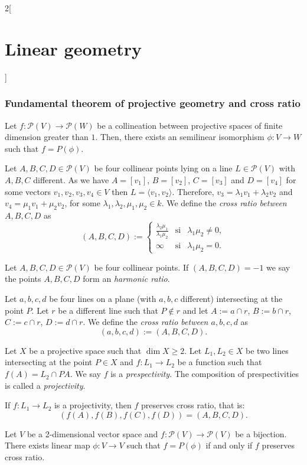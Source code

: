 \documentclass[class=article,10pt,crop=false]{standalone}
\begin{document}
\begin{multicols}{2}[\section{Linear geometry}]
\subsubsection*{Fundamental theorem of projective geometry and cross ratio}
\begin{theorem}
Let $f:\mathcal{P}(V)\rightarrow \mathcal{P}(W)$ be a collineation between projective spaces of finite dimension greater than $1$. Then, there exists an semilinear isomorphism $\phi:V\rightarrow W$ such that $f=P(\phi)$.
\end{theorem}
\begin{definition}
Let $A,B,C,D\in\mathcal{P}(V)$ be four collinear points lying on a line $L\in\mathcal{P}(V)$ with $A,B,C$ different. As we have $A=[v_1]$, $B=[v_2]$, $C=[v_3]$ and $D=[v_4]$ for some vectors $v_1,v_2,v_3,v_4\in V$ then $L=\langle v_1,v_2\rangle$. Therefore, $v_3=\lambda_1v_1+\lambda_2v_2$ and $v_4=\mu_1v_1+\mu_2v_2$, for some $\lambda_1,\lambda_2,\mu_1,\mu_2\in k$. We define the \textit{cross ratio between $A,B,C,D$} as $$(A,B,C,D):=\left\{\begin{array}{ccc}
    \displaystyle\frac{\lambda_2\mu_1}{\lambda_1\mu_2} & \text{si} & \lambda_1\mu_2\ne0, \\
    \infty & \text{si} & \lambda_1\mu_2=0.
\end{array}\right.$$ 
\end{definition}
\begin{definition}
Let $A,B,C,D\in\mathcal{P}(V)$ be four collinear points. If $(A,B,C,D)=-1$ we say the points $A,B,C,D$ form an \textit{harmonic ratio}.
\end{definition}
\begin{definition}
Let $a,b,c,d$ be four lines on a plane (with $a,b,c$ different) intersecting at the point $P$. Let $r$ be a different line such that $P\notin r$ and let $A:=a\cap r$, $B:=b\cap r$, $C:=c\cap r$, $D:=d\cap r$. We define the \textit{cross ratio between $a,b,c,d$} as $$(a,b,c,d):=(A,B,C,D).$$
\end{definition}
\begin{definition}
Let $X$ be a projective space such that $\dim X\geq 2$. Let $L_1,L_2\in X$ be two lines intersecting at the point $P\in X$ and $f:L_1\rightarrow L_2$ be a function such that $f(A)=L_2\cap PA$. We say $f$ is a \textit{prespectivity}. The composition of prespectivities is called a \textit{projectivity}.
\end{definition}
\begin{theorem}
If $f:L_1\rightarrow L_2$ is a projectivity, then $f$ preserves cross ratio, that is: $$(f(A),f(B),f(C),f(D))=(A,B,C,D).$$
\end{theorem}
\begin{theorem}
Let $V$ be a 2-dimensional vector space and $f:\mathcal{P}(V)\rightarrow \mathcal{P}(V)$ be a bijection. There exists linear map $\phi:V\rightarrow V$ such that $f=P(\phi)$ if and only if $f$ preserves cross ratio.
\end{theorem}

\end{multicols}
\end{document}
